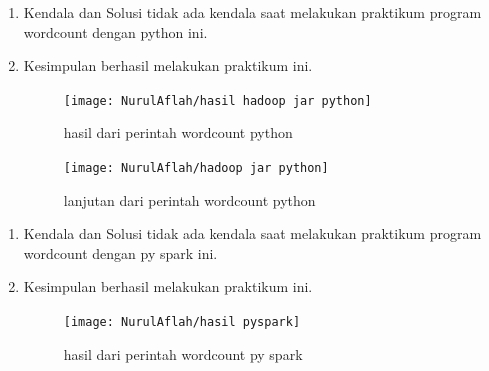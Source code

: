 \begin{enumerate}
\item Kendala dan Solusi
\newline tidak ada kendala saat melakukan praktikum program wordcount dengan python ini.

\item Kesimpulan
\newline berhasil melakukan praktikum ini.
\newpage
\begin{figure} [!ht]
\texttt{[image: NurulAflah/hasil hadoop jar python]}
\caption{hasil dari perintah wordcount python}
\label{gam:hasil hadoop jar python}
\end{figure}

\begin{figure} [!ht]
\texttt{[image: NurulAflah/hadoop jar python]}
\caption{lanjutan dari perintah wordcount python}
\label{gam:hadoop jar python}
\end{figure}
\end{enumerate}

\begin{enumerate}
\item Kendala dan Solusi
\newline tidak ada kendala saat melakukan praktikum program wordcount dengan py spark ini.

\item Kesimpulan
\newline berhasil melakukan praktikum ini.
\newpage
\begin{figure} [!ht]
\texttt{[image: NurulAflah/hasil pyspark]}
\caption{hasil dari perintah wordcount py spark}
\label{gam:hasil pyspark}
\end{figure}
\end{enumerate}


